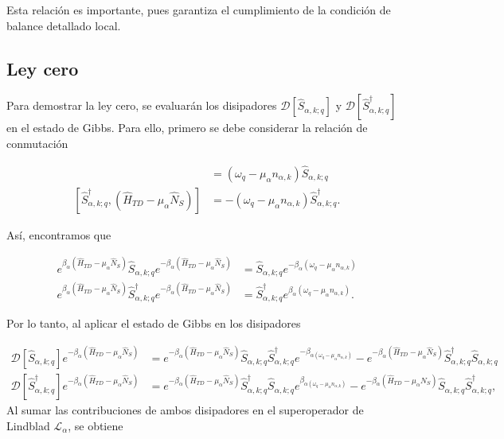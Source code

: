 \begin{appendixs}
Esta relación es importante, pues garantiza el cumplimiento de la condición de balance detallado local. 

\label{apendixKMS}


\newpage

\subsection{Ley cero}
Para demostrar la ley cero, se evaluarán los disipadores $\mathcal{D}[\hat{S}_{\alpha,k;q}]$ y $\mathcal{D}[\hat{S}^{\dagger}_{\alpha,k;q}]$ en el estado de Gibbs. Para ello, primero se debe considerar la relación de conmutación

\begin{align*}
    [\hat{S}_{\alpha,k;q},(\hat{H}_{TD} - \mu_{\alpha}\hat{N}_{S})] & = (\omega_{q} - \mu_{\alpha}n_{\alpha,k})\hat{S}_{\alpha,k;q}  \\
    [\hat{S}^{\dagger}_{\alpha,k;q},(\hat{H}_{TD} - \mu_{\alpha}\hat{N}_{S})] & = -(\omega_{q} - \mu_{\alpha}n_{\alpha,k})\hat{S}^{\dagger}_{\alpha,k;q}.
\end{align*}

Así, encontramos que 

 \begin{align*}
    e^{\beta_{\alpha}(\hat{H}_{TD} - \mu_{\alpha}\hat{N}_{S})}\hat{S}_{\alpha,k;q} e^{-\beta_{\alpha}(\hat{H}_{TD} - \mu_{\alpha}\hat{N}_{S})} & = \hat{S}_{\alpha,k;q}e^{-\beta_{\alpha}(\omega_{q} - \mu_{\alpha}n_{\alpha,k})} \\
    e^{\beta_{\alpha}(\hat{H}_{TD} - \mu_{\alpha}\hat{N}_{S})}\hat{S}^{\dagger}_{\alpha,k;q} e^{-\beta_{\alpha}(\hat{H}_{TD} - \mu_{\alpha}\hat{N}_{S})} & = \hat{S}^{\dagger}_{\alpha,k;q}e^{\beta_{\alpha}(\omega_{q} - \mu_{\alpha}n_{\alpha,k})}.
 \end{align*}

Por lo tanto, al aplicar el estado de Gibbs en los disipadores 

\begin{align*}
    \mathcal{D}[\hat{S}_{\alpha,k;q}]e^{-\beta_{\alpha}(\hat{H}_{TD} - \mu_{\alpha}\hat{N}_{S})} & =  e^{-\beta_{\alpha}(\hat{H}_{TD} - \mu_{\alpha}\hat{N}_{S})} \hat{S}_{\alpha,k;q}\hat{S}^{\dagger}_{\alpha,k;q} e^{-\beta_{\alpha(\omega_{q} - \mu_{\alpha}n_{\alpha,k})}} - e^{-\beta_{\alpha}(\hat{H}_{TD} - \mu_{\alpha}\hat{N}_{S})} \hat{S}^{\dagger}_{\alpha,k;q}\hat{S}_{\alpha,k;q} \\
    \mathcal{D}[\hat{S}^{\dagger}_{\alpha,k;q}]e^{-\beta_{\alpha}(\hat{H}_{TD} - \mu_{\alpha}\hat{N}_{S})} & = e^{-\beta_{\alpha}(\hat{H}_{TD} - \mu_{\alpha}\hat{N}_{S})} \hat{S}^{\dagger}_{\alpha,k;q}\hat{S}_{\alpha,k;q} e^{\beta_{\alpha(\omega_{q} - \mu_{\alpha}n_{\alpha,k})}} - e^{-\beta_{\alpha}(\hat{H}_{TD} - \mu_{\alpha}\hat{N}_{S})} \hat{S}_{\alpha,k;q}\hat{S}^{\dagger}_{\alpha,k;q}, 
\end{align*}
Al sumar las contribuciones de ambos disipadores en el superoperador de Lindblad $\mathcal{L}_{\alpha}$, se obtiene 


\end{appendixs}
